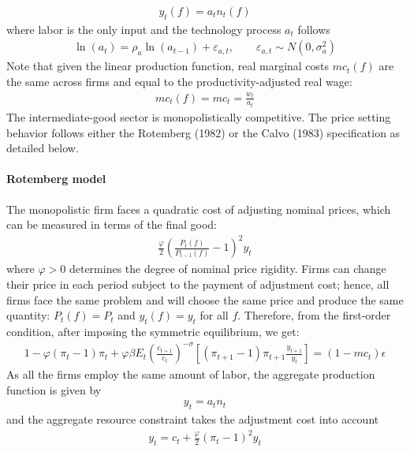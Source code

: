 \documentclass{article}
\numberwithin{equation}{section}
\begin{document}
\begin{align*}
y_t(f) = a_t n_t(f)
\end{align*}
where labor is the only input and the technology process \(a_t\) follows
\begin{align}
\ln(a_t) = \rho_a \ln(a_{t-1}) + \varepsilon_{a,t}, \qquad \varepsilon_{a,t} \sim N(0,\sigma_a^2) \label{eq:CalvoRotemberg:Technology}
\end{align}
Note that given the linear production function, real marginal costs \(mc_t(f)\) are the same across firms and equal to the productivity-adjusted real wage:
\begin{align}
mc_t(f) = mc_t = \frac{w_t}{a_t} \label{eq:CalvoRotemberg:MarginalCosts}
\end{align}
The intermediate-good sector is monopolistically competitive.
The price setting behavior follows either the Rotemberg (1982) or the Calvo (1983) specification as detailed below.

\paragraph{Rotemberg model}
The monopolistic firm faces a quadratic cost of adjusting nominal prices, which can be measured in terms of the final good:
\begin{align*}
\frac{\varphi}{2} {\left(\frac{P_t(f)}{P_{t-1}(f)}-1\right)}^2 y_t
\end{align*}
where \(\varphi>0\) determines the degree of nominal price rigidity.
Firms can change their price in each period subject to the payment of adjustment cost;
  hence, all firms face the same problem and will choose the same price and produce the same quantity:
  \(P_t(f) = P_t\) and \(y_t(f) = y_t\) for all \(f\).
Therefore, from the first-order condition, after imposing the symmetric equilibrium, we get:
\begin{align}
1- \varphi(\pi_t - 1) \pi_t + \varphi \beta E_t {\left(\frac{c_{t+1}}{c_t}\right)}^{-\sigma} \left[(\pi_{t+1}-1)\pi_{t+1} \frac{y_{t+1}}{y_t}\right]
  = (1-mc_t)\epsilon \label{eq:Rotemberg:PriceSetting}
\end{align}
As all the firms employ the same amount of labor, the aggregate production function is given by
\begin{align}
y_t = a_t n_t \label{eq:Rotemberg:AggregateSupply}
\end{align}
and the aggregate resource constraint takes the adjustment cost into account
\begin{align}
y_t = c_t + \frac{\varphi}{2} {\left(\pi_t-1\right)}^2 y_t \label{eq:Rotemberg:ResourceConstraint}
\end{align}
\end{document}
